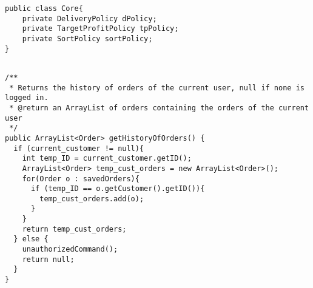 \begin{lstlisting}[caption=Aggregation applied to the \Core~and its policies.,
  label=lst:aggregationCore]
public class Core{
    private DeliveryPolicy dPolicy;
    private TargetProfitPolicy tpPolicy;
    private SortPolicy sortPolicy;
}
  
\end{lstlisting}


\begin{lstlisting}[caption=Application of the \texttt{current\_customer}
  concept to \texttt{getHistoryOfOrders}.,
  label=lst:historyOfOrders]
/**
 * Returns the history of orders of the current user, null if none is logged in.
 * @return an ArrayList of orders containing the orders of the current user
 */
public ArrayList<Order> getHistoryOfOrders() {
  if (current_customer != null){
    int temp_ID = current_customer.getID();
    ArrayList<Order> temp_cust_orders = new ArrayList<Order>();
    for(Order o : savedOrders){
      if (temp_ID == o.getCustomer().getID()){
        temp_cust_orders.add(o);
      }
    }
    return temp_cust_orders;
  } else {
    unauthorizedCommand();
    return null;
  }
}
\end{lstlisting}



  
  
  
\lstset{basicstyle=\rm\small\ttfamily}
